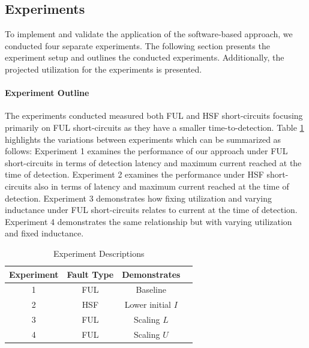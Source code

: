 \clearpage \subsection{Experiments}\label{subsec:experiments}
To implement and validate the application of the software-based approach, we conducted four separate experiments. The following section presents the experiment setup and outlines the conducted experiments. Additionally, the projected utilization for the experiments is presented.

\paragraph{Experiment Outline}
The experiments conducted measured both FUL and HSF short-circuits focusing primarily on FUL short-circuits as they have a smaller time-to-detection.
Table \ref{tab:ExperimentDescriptions} highlights the variations between experiments which can be summarized as follows:
Experiment 1 examines the performance of our approach under FUL short-circuits in terms of detection latency and maximum current reached at the time of detection. Experiment 2 examines the performance under HSF short-circuits also in terms of latency and maximum current reached at the time of detection.
Experiment 3 demonstrates how fixing utilization and varying inductance under FUL short-circuits relates to current at the time of detection.
Experiment 4 demonstrates the same relationship but with varying utilization and fixed inductance.
\begin{table}[!h]
    \centering	
    \bgroup
    \def\arraystretch{1.00}%
    \begin{tabular}{| c | c | c | c |}
            \hline			
            Experiment & Fault Type & Demonstrates\\ \hline \hline \cline{1-3}
            1 & FUL & Baseline\\ \hline
            2 & HSF & Lower initial $I$\\ \hline
            3 & FUL & Scaling $L$\\ \hline
            4 & FUL & Scaling $U$\\ \hline  
    \end{tabular}
    \egroup
    \caption{Experiment Descriptions}
    \label{tab:ExperimentDescriptions}
\end{table}

